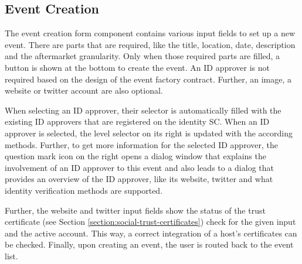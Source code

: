 \subsection{Event Creation}\label{design:event-creation}
The event creation form component contains various input fields to set up a new event. There are parts that are required, like the title, location, date, description and the aftermarket granularity. Only when those required parts are filled, a button is shown at the bottom to create the event. An ID approver is not required based on the design of the event factory contract. Further, an image, a website or twitter account are also optional.

When selecting an ID approver, their selector is automatically filled with the existing ID approvers that are registered on the identity SC. When an ID approver is selected, the level selector on its right is updated with the according methods. Further, to get more information for the selected ID approver, the question mark icon on the right opens a dialog window that explains the involvement of an ID approver to this event and also leads to a dialog that provides an overview of the ID approver, like its website, twitter and what identity verification methods are supported.

Further, the website and twitter input fields show the status of the trust certificate (see Section \ref{section:social-trust-certificates}) check for the given input and the active account. This way, a correct integration of a host's certificates can be checked. Finally, upon creating an event, the user is routed back to the event list.

